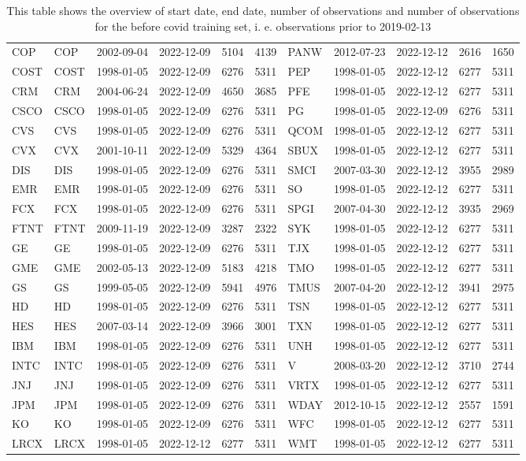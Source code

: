 \begin{table}[ht]
\begin{tabular}{llllrrlllrr}
  COP & COP & 2002-09-04 & 2022-12-09 & 5104 & 4139 & PANW & 2012-07-23 & 2022-12-12 & 2616 & 1650 \\ 
  COST & COST & 1998-01-05 & 2022-12-09 & 6276 & 5311 & PEP & 1998-01-05 & 2022-12-12 & 6277 & 5311 \\ 
  CRM & CRM & 2004-06-24 & 2022-12-09 & 4650 & 3685 & PFE & 1998-01-05 & 2022-12-12 & 6277 & 5311 \\ 
  CSCO & CSCO & 1998-01-05 & 2022-12-09 & 6276 & 5311 & PG & 1998-01-05 & 2022-12-09 & 6276 & 5311 \\ 
  CVS & CVS & 1998-01-05 & 2022-12-09 & 6276 & 5311 & QCOM & 1998-01-05 & 2022-12-12 & 6277 & 5311 \\ 
  CVX & CVX & 2001-10-11 & 2022-12-09 & 5329 & 4364 & SBUX & 1998-01-05 & 2022-12-12 & 6277 & 5311 \\ 
  DIS & DIS & 1998-01-05 & 2022-12-09 & 6276 & 5311 & SMCI & 2007-03-30 & 2022-12-12 & 3955 & 2989 \\ 
  EMR & EMR & 1998-01-05 & 2022-12-09 & 6276 & 5311 & SO & 1998-01-05 & 2022-12-12 & 6277 & 5311 \\ 
  FCX & FCX & 1998-01-05 & 2022-12-09 & 6276 & 5311 & SPGI & 2007-04-30 & 2022-12-12 & 3935 & 2969 \\ 
  FTNT & FTNT & 2009-11-19 & 2022-12-09 & 3287 & 2322 & SYK & 1998-01-05 & 2022-12-12 & 6277 & 5311 \\ 
  GE & GE & 1998-01-05 & 2022-12-09 & 6276 & 5311 & TJX & 1998-01-05 & 2022-12-12 & 6277 & 5311 \\ 
  GME & GME & 2002-05-13 & 2022-12-09 & 5183 & 4218 & TMO & 1998-01-05 & 2022-12-12 & 6277 & 5311 \\ 
  GS & GS & 1999-05-05 & 2022-12-09 & 5941 & 4976 & TMUS & 2007-04-20 & 2022-12-12 & 3941 & 2975 \\ 
  HD & HD & 1998-01-05 & 2022-12-09 & 6276 & 5311 & TSN & 1998-01-05 & 2022-12-12 & 6277 & 5311 \\ 
  HES & HES & 2007-03-14 & 2022-12-09 & 3966 & 3001 & TXN & 1998-01-05 & 2022-12-12 & 6277 & 5311 \\ 
  IBM & IBM & 1998-01-05 & 2022-12-09 & 6276 & 5311 & UNH & 1998-01-05 & 2022-12-12 & 6277 & 5311 \\ 
  INTC & INTC & 1998-01-05 & 2022-12-09 & 6276 & 5311 & V & 2008-03-20 & 2022-12-12 & 3710 & 2744 \\ 
  JNJ & JNJ & 1998-01-05 & 2022-12-09 & 6276 & 5311 & VRTX & 1998-01-05 & 2022-12-12 & 6277 & 5311 \\ 
  JPM & JPM & 1998-01-05 & 2022-12-09 & 6276 & 5311 & WDAY & 2012-10-15 & 2022-12-12 & 2557 & 1591 \\ 
  KO & KO & 1998-01-05 & 2022-12-09 & 6276 & 5311 & WFC & 1998-01-05 & 2022-12-12 & 6277 & 5311 \\ 
  LRCX & LRCX & 1998-01-05 & 2022-12-12 & 6277 & 5311 & WMT & 1998-01-05 & 2022-12-12 & 6277 & 5311 \\ 
   \hline
\end{tabular}
\caption[Overview]{This table shows the overview of start date, end date, number of observations and number of observations 
                     for the before covid training set, i. e. observations prior to 2019-02-13} 
\label{Table:Overview}
\end{table}
